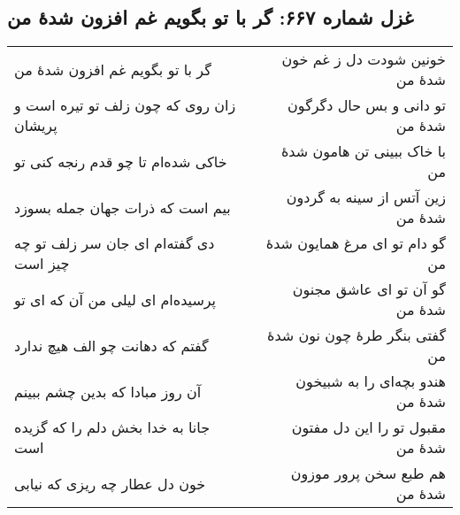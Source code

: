 \begin{center}
\section*{غزل شماره ۶۶۷: گر با تو بگویم غم افزون شدهٔ من}
\label{sec:667}
\begin{longtable}{l p{0.5cm} r}
گر با تو بگویم غم افزون شدهٔ من
&&
خونین شودت دل ز غم خون شدهٔ من
\\
زان روی که چون زلف تو تیره است و پریشان
&&
تو دانی و بس حال دگرگون شدهٔ من
\\
خاکی شده‌ام تا چو قدم رنجه کنی تو
&&
با خاک ببینی تن هامون شدهٔ من
\\
بیم است که ذرات جهان جمله بسوزد
&&
زین آتس از سینه به گردون شدهٔ من
\\
دی گفته‌ام ای جان سر زلف تو چه چیز است
&&
گو دام تو ای مرغ همایون شدهٔ من
\\
پرسیده‌ام ای لیلی من آن که ای تو
&&
گو آن تو ای عاشق مجنون شدهٔ من
\\
گفتم که دهانت چو الف هیچ ندارد
&&
گفتی بنگر طرهٔ چون نون شدهٔ من
\\
آن روز مبادا که بدین چشم ببینم
&&
هندو بچه‌ای را به شبیخون شدهٔ من
\\
جانا به خدا بخش دلم را که گزیده است
&&
مقبول تو را این دل مفتون شدهٔ من
\\
خون دل عطار چه ریزی که نیابی
&&
هم طبع سخن پرور موزون شدهٔ من
\\
\end{longtable}
\end{center}
